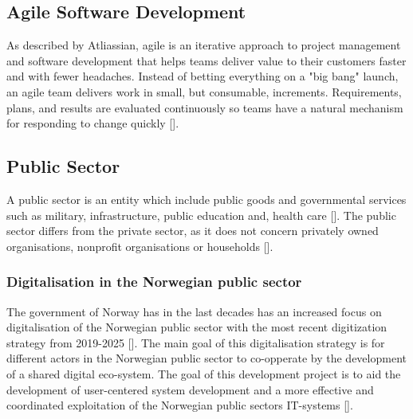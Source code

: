 \subsection{Agile Software Development}
As described by Atliassian, agile is an iterative approach to project management and software development that helps teams deliver value to their customers faster and with fewer headaches. Instead of betting everything on a "big bang" launch, an agile team delivers work in small, but consumable, increments. Requirements, plans, and results are evaluated continuously so teams have a natural mechanism for responding to change quickly [\cite{a_2022}]. 

\subsection{Public Sector}
A public sector is an entity which include public goods and governmental services such as military, infrastructure, public education and, health care [\cite{ps_2022}]. The public sector differs from the private sector, as it does not concern privately owned organisations, nonprofit organisations or households [\cite{os_2022}]. 

\subsubsection{Digitalisation in the Norwegian public sector}
The government of Norway has in the last decades has an increased focus on digitalisation of the Norwegian public sector with the most recent digitization strategy from 2019-2025 [\cite{r_2019}]. The main goal of this digitalisation strategy is for different actors in the Norwegian public sector to co-opperate by the development of a shared digital eco-system. The goal of this development project is to aid the development of user-centered system development and a more effective and coordinated exploitation of the Norwegian public sectors IT-systems [\cite{r_2019}].